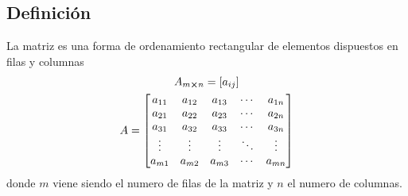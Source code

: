 \subsection{Definición}
La matriz es una forma de ordenamiento rectangular de elementos dispuestos en filas y columnas
\begin{gather*}
	A_{m\cross n}=[a_{ij}]\\
	A=\begin{bmatrix}
		a_{11}&a_{12}&a_{13}&\cdots&a_{1n}\\
		a_{21}&a_{22}&a_{23}&\cdots&a_{2n}\\
		a_{31}&a_{32}&a_{33}&\cdots&a_{3n}\\
		\vdots&\vdots&\vdots&\ddots&\vdots\\
		a_{m1}&a_{m2}&a_{m3}&\cdots&a_{mn}\\
	\end{bmatrix}
\end{gather*}
donde $m$ viene siendo el numero de filas de la matriz y $n$ el numero de columnas.